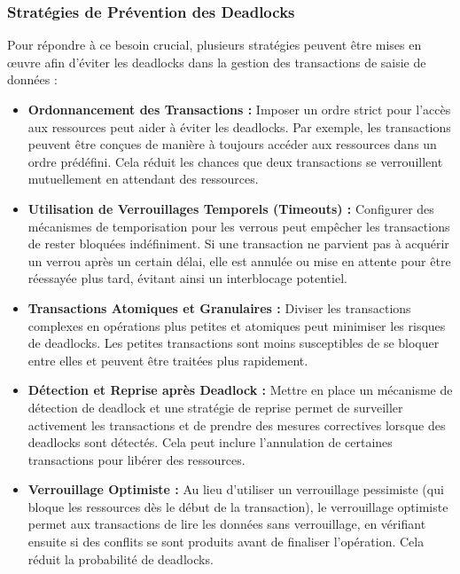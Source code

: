 \documentclass[a4paper, oneside, 12pt, final]{extreport}
\begin{document}
\subsubsection{Stratégies de Prévention des Deadlocks}
Pour répondre à ce besoin crucial, plusieurs stratégies peuvent être mises en œuvre afin d'éviter les deadlocks dans la gestion des transactions de saisie de données :
\begin{itemize}
\item \textbf{Ordonnancement des Transactions :} Imposer un ordre strict pour l'accès aux ressources peut aider à éviter les deadlocks. Par exemple, les transactions peuvent être conçues de manière à toujours accéder aux ressources dans un ordre prédéfini. Cela réduit les chances que deux transactions se verrouillent mutuellement en attendant des ressources.

\item \textbf{Utilisation de Verrouillages Temporels (Timeouts) :} Configurer des mécanismes de temporisation pour les verrous peut empêcher les transactions de rester bloquées indéfiniment. Si une transaction ne parvient pas à acquérir un verrou après un certain délai, elle est annulée ou mise en attente pour être réessayée plus tard, évitant ainsi un interblocage potentiel.

\item \textbf{Transactions Atomiques et Granulaires :} Diviser les transactions complexes en opérations plus petites et atomiques peut minimiser les risques de deadlocks. Les petites transactions sont moins susceptibles de se bloquer entre elles et peuvent être traitées plus rapidement.

\item \textbf{Détection et Reprise après Deadlock :} Mettre en place un mécanisme de détection de deadlock et une stratégie de reprise permet de surveiller activement les transactions et de prendre des mesures correctives lorsque des deadlocks sont détectés. Cela peut inclure l'annulation de certaines transactions pour libérer des ressources.

\item \textbf{Verrouillage Optimiste :} Au lieu d'utiliser un verrouillage pessimiste (qui bloque les ressources dès le début de la transaction), le verrouillage optimiste permet aux transactions de lire les données sans verrouillage, en vérifiant ensuite si des conflits se sont produits avant de finaliser l'opération. Cela réduit la probabilité de deadlocks.
\end{itemize}
\end{document}
